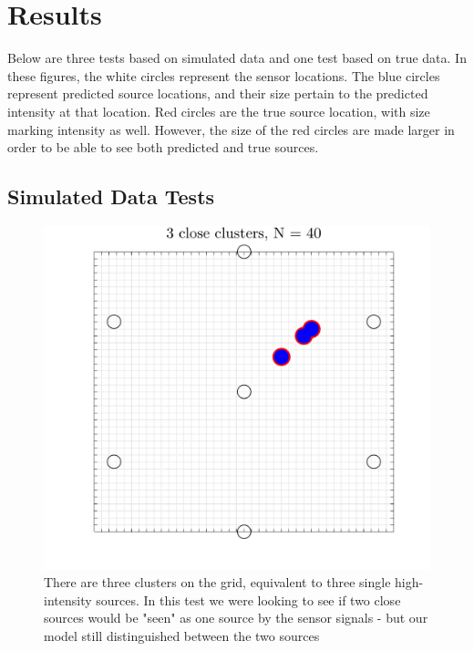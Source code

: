 \documentclass[a4paper]{article}
\begin{document}
\section{Results}
 
Below are three tests based on simulated data and one test based on true data. In these figures, the white circles represent the sensor locations. The blue circles represent predicted source locations, and their size pertain to the predicted intensity at that location. Red circles are the true source location, with size marking intensity as well. However, the size of the red circles are made larger in order to be able to see both predicted and true sources. 
 
\subsection{Simulated Data Tests}
\begin{figure}[H]
\centering
\includegraphics[width=.7\textwidth]{3_close_clusters_copy.pdf}
\caption{There are three clusters on the grid, equivalent to three single high-intensity sources. In this test we were looking to see if two close sources would be "seen" as one source by the sensor signals - but our model still distinguished between the two sources}
\label{Figure 4}
\end{figure}
\end{document}
